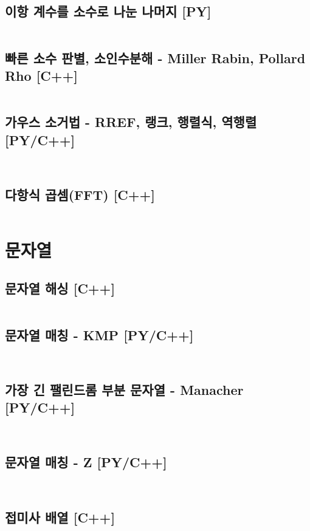 \documentclass[landscape,8pt,a4paper,twocolumn]{extarticle}
\begin{document}
\subsection{이항 계수를 소수로 나눈 나머지 [PY]}
\inputminted{python}{python/Math/LucasTheorem.py}
\subsection{빠른 소수 판별, 소인수분해 - Miller Rabin, Pollard Rho [C++]}
\inputminted{cpp}{mixed/cpp/Math/MillerRabin-PollardRho.hpp}
\subsection{가우스 소거법 - RREF, 랭크, 행렬식, 역행렬 [PY/C++]}
\inputminted{python}{python/Math/Matrix.py}
\inputminted{cpp}{mixed/cpp/Math/Matrix.hpp}
\subsection{다항식 곱셈(FFT) [C++]}
\inputminted{cpp}{mixed/cpp/Math/Convolution.hpp}
\section{문자열}
\subsection{문자열 해싱 [C++]}
\inputminted{cpp}{mixed/cpp/String/Hashing.hpp}
\subsection{문자열 매칭 - KMP [PY/C++]}
\inputminted{python}{python/String/KMP.py}
\inputminted{cpp}{mixed/cpp/String/KMP.hpp}
\subsection{가장 긴 팰린드롬 부분 문자열 - Manacher [PY/C++]}
\inputminted{python}{python/String/Manacher.py}
\inputminted{cpp}{mixed/cpp/String/Manacher.hpp}
\subsection{문자열 매칭 - Z [PY/C++]}
\inputminted{python}{python/String/Z.py}
\inputminted{cpp}{mixed/cpp/String/Z.hpp}
\subsection{접미사 배열 [C++]}
\inputminted{cpp}{mixed/cpp/String/SuffixArray.hpp}
\end{document}
